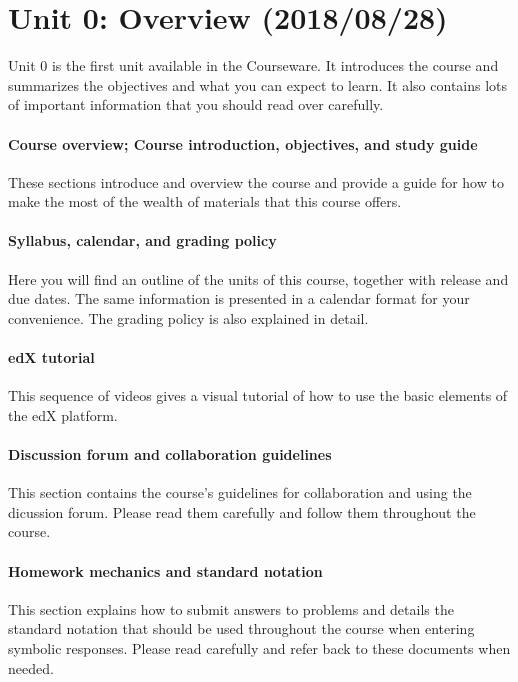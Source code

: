 \documentclass[pdftex, brazil, 12pt, twoside]{article}
\begin{document}
\section{Unit 0: Overview (2018/08/28)}
\label{ovw0}

Unit 0 is the first unit available in the Courseware. It introduces the course and
summarizes the objectives and what you can expect to learn. It also contains lots
of important information that you should read over carefully.

\paragraph{Course overview; Course introduction, objectives, and study guide}
These sections introduce and overview the course and provide a guide for how to
make the most of the wealth of materials that this course offers.

\paragraph{Syllabus, calendar, and grading policy}
Here you will find an outline of the units of this course, together with release
and due dates. The same information is presented in a calendar format for your
convenience. The grading policy is also explained in detail.

\paragraph{edX tutorial}
This sequence of videos gives a visual tutorial of how to use the basic elements
of the edX platform.

\paragraph{Discussion forum and collaboration guidelines}
This section contains the course's guidelines for collaboration and using the
dicussion forum. Please read them carefully and follow them throughout the course.

\paragraph{Homework mechanics and standard notation}
This section explains how to submit answers to problems and details the standard
notation that should be used throughout the course when entering symbolic responses.
Please read carefully and refer back to these documents when needed.
\end{document}
